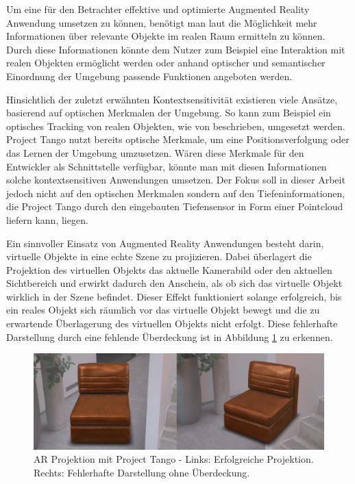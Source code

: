Um eine für den Betrachter effektive und optimierte Augmented Reality Anwendung umsetzen zu können, benötigt man laut \citet{azuma2001recent} die Möglichkeit mehr Informationen über relevante Objekte im realen Raum ermitteln zu können. Durch diese Informationen könnte dem Nutzer zum Beispiel eine Interaktion mit realen Objekten ermöglicht werden oder anhand optischer und semantischer Einordnung der Umgebung passende Funktionen angeboten werden. 

Hinsichtlich der zuletzt erwähnten Kontextsensitivität existieren viele Ansätze, basierend auf optischen Merkmalen der Umgebung. So kann zum Beispiel ein optisches Tracking von realen Objekten, wie von \citet{lee2008hybrid} beschrieben, umgesetzt werden. Project Tango nutzt bereits optische Merkmale, um eine Positionsverfolgung oder das Lernen der Umgebung umzusetzen. Wären diese Merkmale für den Entwickler als Schnittstelle verfügbar, könnte man mit diesen Informationen solche kontextsensitiven Anwendungen umsetzen. Der Fokus soll in dieser Arbeit jedoch nicht auf den optischen Merkmalen sondern auf den Tiefeninformationen, die Project Tango durch den eingebauten Tiefensensor in Form einer Pointcloud liefern kann, liegen.

Ein sinnvoller Einsatz von Augmented Reality Anwendungen besteht darin, virtuelle Objekte in eine echte Szene zu projizieren. Dabei überlagert die Projektion des virtuellen Objekts das aktuelle Kamerabild oder den aktuellen Sichtbereich und erwirkt dadurch den Anschein, als ob sich das virtuelle Objekt wirklich in der Szene befindet. Dieser Effekt funktioniert solange erfolgreich, bis ein reales Objekt sich räumlich vor das virtuelle Objekt bewegt und die zu erwartende Überlagerung des virtuellen Objekts nicht erfolgt. Diese fehlerhafte Darstellung durch eine fehlende Überdeckung ist in Abbildung \ref{fig:occlusion-problem} zu erkennen. 

\begin{figure}[h]
  \centering
	\includegraphics[width=1.0\textwidth]{content/images/occlusion-problem.png} 

  \caption{AR Projektion mit Project Tango - Links: Erfolgreiche Projektion. Rechts: Fehlerhafte Darstellung ohne Überdeckung.}
  \label{fig:occlusion-problem}
\end{figure}

